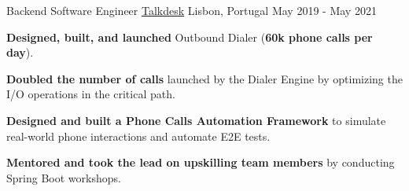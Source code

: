 \begin{cventries}

  \cventry
    {Backend Software Engineer}
    {\href{https://www.talkdesk.com/}{Talkdesk}}
    {Lisbon, Portugal}
    {May 2019 - May 2021}
    {
      \begin{cvitems}
        \item \textbf{Designed, built, and launched} Outbound Dialer (\textbf{60k phone calls per day}).
        \item \textbf{Doubled the number of calls} launched by the Dialer Engine by optimizing the I/O operations in the critical path.
        \item \textbf{Designed and built a Phone Calls Automation Framework} to simulate real-world phone interactions and automate E2E tests.
        \item \textbf{Mentored and took the lead on upskilling team members} by conducting Spring Boot workshops.
      \end{cvitems}
      \vspace{4mm}
    }

    

\end{cventries}

